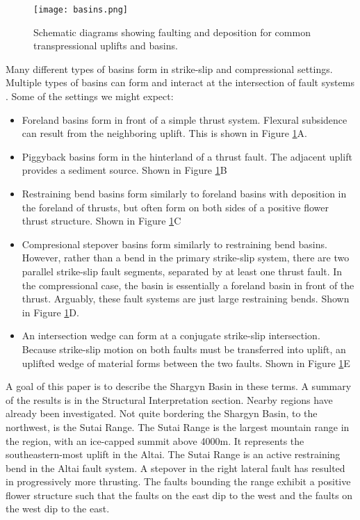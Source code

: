 	
\begin{figure}[h!]
  \centering
  \texttt{[image: basins.png]}
  \caption{Schematic diagrams showing faulting and deposition for common transpressional uplifts and basins.}
  \label{basintypes}
\end{figure}

Many different types of basins form in strike-slip and compressional settings. Multiple types of basins can form and interact at the intersection of fault systems \citep{Busby1995}. Some of the settings we might expect:
\begin{itemize}
	\item Foreland basins form in front of a simple thrust system. Flexural subsidence can result from the neighboring uplift. This is shown in Figure \ref{basintypes}A. 
	\item Piggyback basins form in the hinterland of a thrust fault. The adjacent uplift provides a sediment source. Shown in Figure \ref{basintypes}B
	\item Restraining bend basins form similarly to foreland basins with deposition in the foreland of thrusts, but often form on both sides of a positive flower thrust structure. Shown in Figure \ref{basintypes}C
	\item Compresional stepover basins form similarly to restraining bend basins. However, rather than a bend in the primary strike-slip system, there are two parallel strike-slip fault segments, separated by at least one thrust fault. In the compressional case, the basin is essentially a foreland basin in front of the thrust. Arguably, these fault systems are just large restraining bends. Shown in Figure \ref{basintypes}D.
	\item An intersection wedge can form at a conjugate strike-slip intersection. Because strike-slip motion on both faults must be transferred into uplift, an uplifted wedge of material forms between the two faults. Shown in Figure \ref{basintypes}E
\end{itemize}

	A goal of this paper is to describe the Shargyn Basin in these terms. A summary of the results is in the Structural Interpretation section. Nearby regions have already been investigated. Not quite bordering the Shargyn Basin, to the northwest, is the Sutai Range. The Sutai Range is the largest mountain range in the region, with an ice-capped summit above 4000m. It represents the southeastern-most uplift in the Altai. The Sutai Range is an active restraining bend in the Altai fault system\citep{Cunningham2003}\citep{Howard2006}. A stepover in the right lateral fault has resulted in progressively more thrusting. The faults bounding the range exhibit a positive flower structure such that the faults on the east dip to the west and the faults on the west dip to the east\citep{Cunningham2003}. 
	

